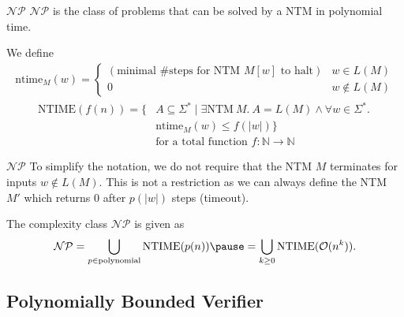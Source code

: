 \documentclass{beamer}
\theoremstyle{definition}
\begin{document}
\begin{frame}{$\mathcal{NP}$}
    $\mathcal{NP}$ is the class of problems that can be solved by a NTM in polynomial time.\pause
    \begin{definition}
        We define \begin{align*}
            \text{ntime}_M(w) = \begin{cases}
                (\text{minimal \#steps for NTM $M[w]$ to halt}) & w \in L(M) \\
                0 & w \not\in L(M)
            \end{cases}
        \end{align*}\pause \begin{align*}
            \text{NTIME}(f(n)) = \{&A \subseteq \Sigma^* \mid \exists \text{NTM}\ M.\ A = L(M) \land \forall w \in \Sigma^*.\ \\&\text{ntime}_M(w) \leq f(|w|)\} \\&\text{for a total function $f : \mathbb{N} \to \mathbb{N}$}
        \end{align*}
    \end{definition}
\end{frame}

\begin{frame}{$\mathcal{NP}$}
    To simplify the notation, we do not require that the NTM $M$ terminates for inputs $w \not\in L(M)$. This is not a restriction as we can always define the NTM $M'$ which returns $0$ after $p(|w|)$ steps (timeout).\pause
    \begin{definition}
        The complexity class $\mathcal{NP}$ is given as \begin{align*}
            \mathcal{NP} = \bigcup_{p \in \text{polynomial}} \text{NTIME}(p(n)) \pause= \bigcup_{k \geq 0} \text{NTIME}(\mathcal{O}(n^k)).
        \end{align*}
    \end{definition}
\end{frame}

\subsection{Polynomially Bounded Verifier}
\end{document}
